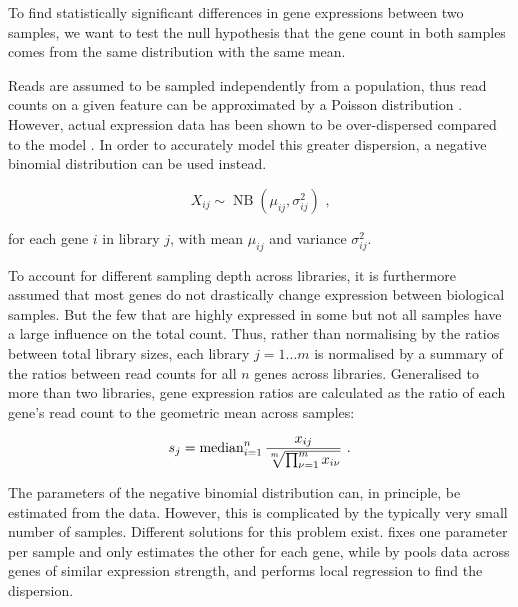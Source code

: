 To find statistically significant differences in gene expressions between two
samples, we want to test the null hypothesis that the gene count in both samples
comes from the same distribution with the same mean.

Reads are assumed to be sampled independently from a population, thus read
counts on a given feature can be approximated by a Poisson distribution
\citep{Mortazavi:2008, Marioni:2008}. However, actual expression data has been
shown to be over-dispersed compared to the model \citep{Robinson:2007}. In order
to accurately model this greater dispersion, a negative binomial distribution
can be used instead.

\begin{equation}
    X_{ij} \sim \operatorname{NB}(\mu_{ij}, \sigma^2_{ij}) \text{\ ,}
\end{equation}

for each gene \(i\) in library \(j\), with mean \(\mu_{ij}\) and variance
\(\sigma^2_{ij}\).

To account for different sampling depth across libraries, it is furthermore
assumed that most genes do not drastically change expression between biological
samples. But the few that are highly expressed in some but not all samples have
a large influence on the total count. Thus, rather than normalising by the
ratios between total library sizes, each library \(j = 1 \dots m\) is normalised
by a summary of the ratios between read counts for all \(n\) genes across
libraries. Generalised to more than two libraries, gene expression ratios are
calculated as the ratio of each gene’s read count to the geometric mean across
samples:

\begin{equation}
    s_j = \operatorname{median}_{i = 1}^n
        \frac{x_{ij}}{\sqrt[\uproot{2}m]{\prod_{\nu = 1}^m x_{i\nu}}}
        \text{\ .}
\end{equation}

The parameters of the negative binomial distribution can, in principle, be
estimated from the data. However, this is complicated by the typically very
small number of samples. Different solutions for this problem exist.
 \citep{Robinson:2010} fixes one parameter per sample and only
estimates the other for each gene, while  by \citet{Anders:2010}
pools data across genes of similar expression strength, and performs local
regression to find the dispersion.
